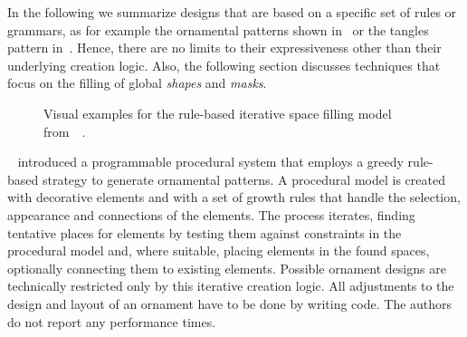 In the following we summarize designs that are based on a specific set of rules or grammars, as for example the ornamental patterns shown in~ or the tangles pattern in~. Hence, there are no limits to their expressiveness other than their underlying creation logic. Also, the following section discusses techniques that focus on the filling of global \textit{shapes} and \textit{masks}.

\begin{figure}[H]
    \centering
    \caption{\label{fig:wong_1998_cgf}Visual examples for the rule-based iterative space filling model from~\citeauthor*{wong_1998_cgf}~\cite{wong_1998_cgf}.}
\end{figure}


\citeauthor*{wong_1998_cgf}~\cite{wong_1998_cgf} introduced a programmable procedural system that employs a greedy rule-based strategy to generate ornamental patterns. A procedural model is created with decorative elements and with a set of growth rules that handle the selection, appearance and connections of the elements. The process iterates, finding tentative places for elements by testing them against constraints in the procedural model and, where suitable, placing elements in the found spaces, optionally connecting them to existing elements. Possible ornament designs are technically restricted only by this iterative creation logic. All adjustments to the design and layout of an ornament have to be done by writing code. The authors do not report any performance times.

